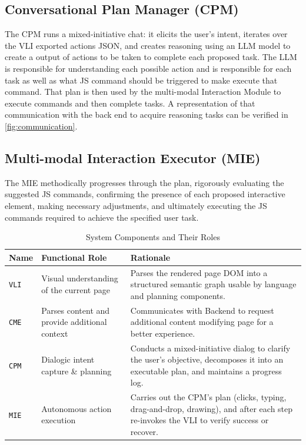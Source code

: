 \documentclass[conference]{IEEEtran}
\begin{document}
\subsection{Conversational Plan Manager (CPM)}

The CPM runs a mixed‑initiative chat: it elicits the user's intent, iterates over the VLI exported actions JSON, and creates reasoning using an LLM model to create a output of actions to be taken to complete each proposed task. The LLM is responsible for understanding each possible action and is responsible for each task as well as what JS command should be triggered to make execute that command. That plan is then used by the multi-modal Interaction Module to execute commands and then complete tasks. A representation of that communication with the back end to acquire reasoning tasks can be verified in \autoref{fig:communication}.

\subsection{Multi-modal Interaction Executor (MIE)}

The MIE methodically progresses through the plan, rigorously evaluating the suggested JS commands, confirming the presence of each proposed interactive element, making necessary adjustments, and ultimately executing the JS commands required to achieve the specified user task.

\begin{table}[h]
\centering
\caption{System Components and Their Roles}
\label{tab:architecture}
\small
\renewcommand{\arraystretch}{1.3}
\begin{tabular}{|>{\raggedright\arraybackslash}p{0.8cm}|>{\raggedright\arraybackslash}p{2.5cm}|>{\raggedright\arraybackslash}p{4cm}|}
\hline
\textbf{Name} & \textbf{Functional Role} & \textbf{Rationale} \\
\hline
\texttt{VLI} & Visual understanding of the current page & Parses the rendered page DOM into a structured semantic graph usable by language and planning components. \\
\hline
\texttt{CME} & Parses content and provide additional context & Communicates with Backend to request additional content modifying page for a better experience. \\
\hline
\texttt{CPM} & Dialogic intent capture \& planning & Conducts a mixed-initiative dialog to clarify the user's objective, decomposes it into an executable plan, and maintains a progress log. \\
\hline
\texttt{MIE} & Autonomous action execution & Carries out the CPM's plan (clicks, typing, drag-and-drop, drawing), and after each step re-invokes the VLI to verify success or recover. \\
\hline
\end{tabular}
\end{table}
\end{document}
